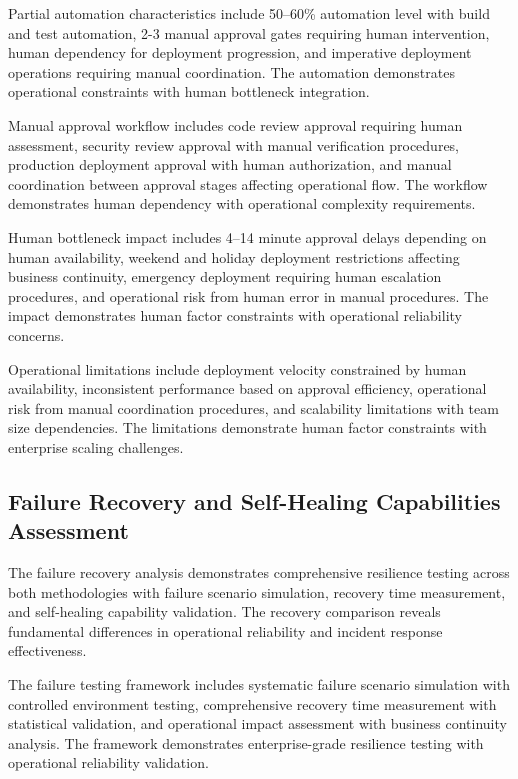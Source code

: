 Partial automation characteristics include 50--60\% automation level with build and test automation, 2-3 manual approval gates requiring human intervention, human dependency for deployment progression, and imperative deployment operations requiring manual coordination. The automation demonstrates operational constraints with human bottleneck integration.

Manual approval workflow includes code review approval requiring human assessment, security review approval with manual verification procedures, production deployment approval with human authorization, and manual coordination between approval stages affecting operational flow. The workflow demonstrates human dependency with operational complexity requirements.

Human bottleneck impact includes 4--14 minute approval delays depending on human availability, weekend and holiday deployment restrictions affecting business continuity, emergency deployment requiring human escalation procedures, and operational risk from human error in manual procedures. The impact demonstrates human factor constraints with operational reliability concerns.

Operational limitations include deployment velocity constrained by human availability, inconsistent performance based on approval efficiency, operational risk from manual coordination procedures, and scalability limitations with team size dependencies. The limitations demonstrate human factor constraints with enterprise scaling challenges.


\subsection{Failure Recovery and Self-Healing Capabilities Assessment}
\label{subsec:failure_recovery}

The failure recovery analysis demonstrates comprehensive resilience testing across both methodologies with failure scenario simulation, recovery time measurement, and self-healing capability validation. The recovery comparison reveals fundamental differences in operational reliability and incident response effectiveness.

The failure testing framework includes systematic failure scenario simulation with controlled environment testing, comprehensive recovery time measurement with statistical validation, and operational impact assessment with business continuity analysis. The framework demonstrates enterprise-grade resilience testing with operational reliability validation.

